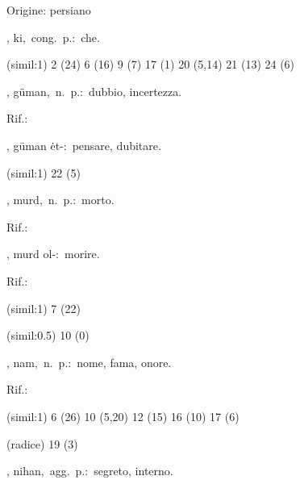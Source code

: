 \begin{glossario}{Origine: persiano}
\begin{subvocedue}
\end{subvocedue}
\item[{\color{colorlowref}\spzrl{k^H}},] {\sf ki},\ cong.\ p.:\ che.
\begin{subvocedue}
\item[(simil:1)]   2 (24) 6 (16) 9 (7) 17 (1) 20 (5,14) 21 (13) 24 (6)
\end{subvocedue}
\item[{\color{colorlowref}\spzrl{gumAn}},] {\sf güman},\ n.\ p.:\ dubbio, incertezza.
\begin{subvocedue}
\item[Rif.:] 
\end{subvocedue}
\begin{subvocedue}
\item[\subglossariobullet] , {\sf güman ėt-}:\ pensare, dubitare.
\item[(simil:1)]   22 (5)
\end{subvocedue}
\item[{\color{colorlowref}\spzrl{murd}},] {\sf murd},\ n.\ p.:\ morto.
\begin{subvocedue}
\item[Rif.:] 
\end{subvocedue}
\begin{subvocedue}
\item[\subglossariobullet] , {\sf murd ol-}:\ morire.
\begin{subvocedue}
\item[Rif.:] 
\end{subvocedue}
\item[(simil:1)]   7 (22)
\item[(simil:0.5)]   10 (0)
\end{subvocedue}
\item[{\color{colorlowref}\spzrl{nAm}},] {\sf nam},\ n.\ p.:\ nome, fama, onore.
\begin{subvocedue}
\item[Rif.:] 
\end{subvocedue}
\begin{subvocedue}
\item[(simil:1)]   6 (26) 10 (5,20) 12 (15) 16 (10) 17 (6)
\item[(radice)]   19 (3)
\end{subvocedue}
\item[{\color{colorlowref}\spzrl{nihAn}},] {\sf nihan},\ agg.\ p.:\ segreto, interno.

\end{glossario}
